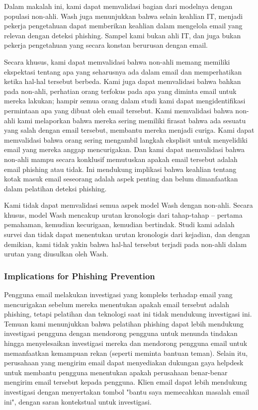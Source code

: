 \documentclass[lettersize,journal]{IEEEtran}
\begin{document}
Dalam makalah ini, kami dapat memvalidasi bagian dari modelnya dengan populasi
non-ahli. Wash juga menunjukkan bahwa selain keahlian IT, menjadi pekerja
pengetahuan dapat memberikan keahlian dalam mengelola email yang relevan dengan
deteksi phishing. Sampel kami bukan ahli IT, dan juga bukan pekerja pengetahuan
yang secara konstan berurusan dengan email.

Secara khusus, kami dapat memvalidasi bahwa non-ahli memang memiliki ekspektasi
tentang apa yang seharusnya ada dalam email dan memperhatikan ketika hal-hal
tersebut berbeda. Kami juga dapat memvalidasi bahwa bahkan pada non-ahli,
perhatian orang terfokus pada apa yang diminta email untuk mereka lakukan;
hampir semua orang dalam studi kami dapat mengidentifikasi permintaan apa yang
dibuat oleh email tersebut. Kami memvalidasi bahwa non-ahli kami melaporkan
bahwa mereka sering memiliki firasat bahwa ada sesuatu yang salah dengan email
tersebut, membantu mereka menjadi curiga. Kami dapat memvalidasi bahwa orang
sering mengambil langkah eksplisit untuk menyelidiki email yang mereka anggap
mencurigakan. Dan kami dapat memvalidasi bahwa non-ahli mampu secara konklusif
memutuskan apakah email tersebut adalah email phishing atau tidak. Ini
mendukung implikasi bahwa keahlian tentang kotak masuk email seseorang adalah
aspek penting dan belum dimanfaatkan dalam pelatihan deteksi phishing.

Kami tidak dapat memvalidasi semua aspek model Wash dengan non-ahli. Secara
khusus, model Wash mencakup urutan kronologis dari tahap-tahap – pertama
pemahaman, kemudian kecurigaan, kemudian bertindak. Studi kami adalah survei
dan tidak dapat menentukan urutan kronologis dari kejadian, dan dengan
demikian, kami tidak yakin bahwa hal-hal tersebut terjadi pada non-ahli dalam
urutan yang diusulkan oleh Wash.

\subsubsection{Implications for Phishing Prevention}
Pengguna email melakukan investigasi yang kompleks terhadap email yang
mencurigakan sebelum mereka menentukan apakah email tersebut adalah phishing,
tetapi pelatihan dan teknologi saat ini tidak mendukung investigasi ini. Temuan
kami menunjukkan bahwa pelatihan phishing dapat lebih mendukung investigasi
pengguna dengan mendorong pengguna untuk menunda tindakan hingga menyelesaikan
investigasi mereka dan mendorong pengguna email untuk memanfaatkan kemampuan
rekan (seperti meminta bantuan teman). Selain itu, perusahaan yang mengirim
email dapat menyediakan dukungan gaya helpdesk untuk membantu pengguna
menentukan apakah perusahaan benar-benar mengirim email tersebut kepada
pengguna. Klien email dapat lebih mendukung investigasi dengan menyertakan
tombol "bantu saya memecahkan masalah email ini", dengan saran kontekstual
untuk investigasi.
\end{document}
